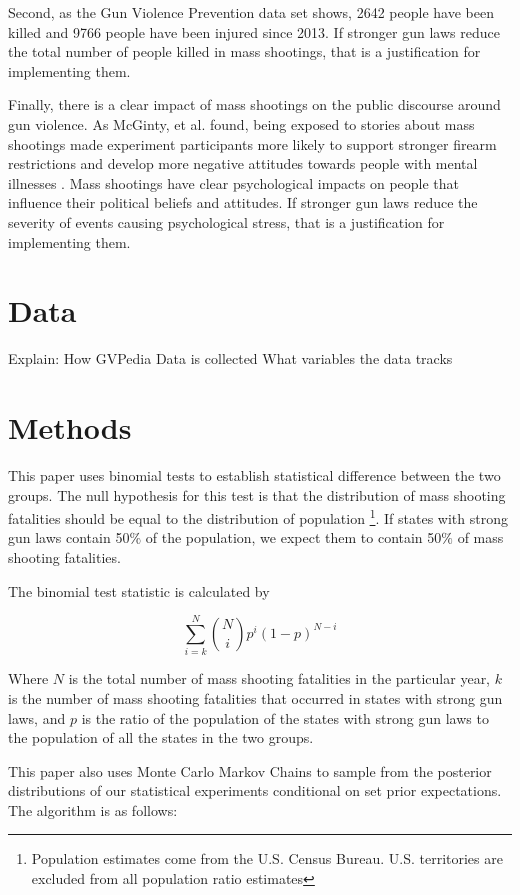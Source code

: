 \documentclass{article}
\begin{document}
Second, as the Gun Violence Prevention data set shows, 2642 people have been killed and 9766 people have been injured since 2013. If stronger gun laws reduce the total number of people killed in mass shootings, that is a justification for implementing them.

Finally, there is a clear impact of mass shootings on the public discourse around gun violence. As McGinty, et al. found, being exposed to stories about mass shootings made experiment participants more likely to support stronger firearm restrictions and develop more negative attitudes towards people with mental illnesses \cite{2}. Mass shootings have clear psychological impacts on people that influence their political beliefs and attitudes. If stronger gun laws reduce the severity of events causing psychological stress, that is a justification for implementing them.

\section{Data}
Explain:
How GVPedia Data is collected
What variables the data tracks

\section{Methods}

This paper uses binomial tests to establish statistical difference between the two groups. The null hypothesis for this test is that the distribution of mass shooting fatalities should be equal to the distribution of population \footnote{Population estimates come from the U.S. Census Bureau. U.S. territories are excluded from all population ratio estimates}. If states with strong gun laws contain 50$\%$ of the population, we expect them to contain 50$\%$ of mass shooting fatalities.

The binomial test statistic is calculated by

\begin{equation}
\sum_{i=k}^{N} \binom{N}{i}p^{i}(1-p)^{N-i}
\end{equation}

Where $N$ is the total number of mass shooting fatalities in the particular year, $k$ is the number of mass shooting fatalities that occurred in states with strong gun laws, and $p$ is the ratio of the population of the states with strong gun laws to the population of all the states in the two groups.  

This paper also uses Monte Carlo Markov Chains to sample from the posterior distributions of our statistical experiments conditional on set prior expectations. The algorithm is as follows:
\end{document}

